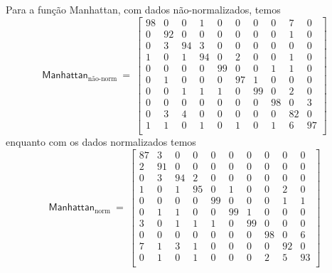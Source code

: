 \documentclass[10pt,a4paper,twocolumn]{article}
\begin{document}
      Para a função Manhattan, com dados não-normalizados, temos
      \begin{equation*}
        \textsf{Manhattan}_\text{não-norm}~=~ \left [
        \begin{smallmatrix}
          98 &  0 &  0 &  1 &  0 &  0 &  0 &  0 &  7 &  0 \\
           0 & 92 &  0 &  0 &  0 &  0 &  0 &  0 &  1 &  0 \\ 
           0 &  3 & 94 &  3 &  0 &  0 &  0 &  0 &  0 &  0 \\ 
           1 &  0 &  1 & 94 &  0 &  2 &  0 &  0 &  1 &  0 \\ 
           0 &  0 &  0 &  0 & 99 &  0 &  0 &  1 &  1 &  0 \\ 
           0 &  1 &  0 &  0 &  0 & 97 &  1 &  0 &  0 &  0 \\ 
           0 &  0 &  1 &  1 &  1 &  0 & 99 &  0 &  2 &  0 \\ 
           0 &  0 &  0 &  0 &  0 &  0 &  0 & 98 &  0 &  3 \\ 
           0 &  3 &  4 &  0 &  0 &  0 &  0 &  0 & 82 &  0 \\ 
           1 &  1 &  0 &  1 &  0 &  1 &  0 &  1 &  6 & 97 \\ 
        \end{smallmatrix} \right ]
      \end{equation*}
      enquanto com os dados normalizados temos
      \begin{equation*}
        \textsf{Manhattan}_\text{norm}~=~ \left [
        \begin{smallmatrix}
          87 &  3 &  0 &  0 &  0 &  0 &  0 &  0 &  0 &  0 \\
           2 & 91 &  0 &  0 &  0 &  0 &  0 &  0 &  0 &  0 \\ 
           0 &  3 & 94 &  2 &  0 &  0 &  0 &  0 &  0 &  0 \\ 
           1 &  0 &  1 & 95 &  0 &  1 &  0 &  0 &  2 &  0 \\ 
           0 &  0 &  0 &  0 & 99 &  0 &  0 &  0 &  1 &  1 \\ 
           0 &  1 &  1 &  0 &  0 & 99 &  1 &  0 &  0 &  0 \\ 
           3 &  0 &  1 &  1 &  1 &  0 & 99 &  0 &  0 &  0 \\ 
           0 &  0 &  0 &  0 &  0 &  0 &  0 & 98 &  0 &  6 \\ 
           7 &  1 &  3 &  1 &  0 &  0 &  0 &  0 & 92 &  0 \\ 
           0 &  1 &  0 &  1 &  0 &  0 &  0 &  2 &  5 & 93 \\ 
        \end{smallmatrix} \right ]
      \end{equation*}
\end{document}
